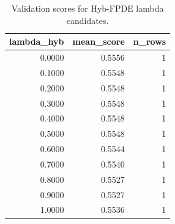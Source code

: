 \begin{table}[t]
\caption{Validation scores for Hyb-FPDE lambda candidates.}
\label{tab:lambda_distribution_computed}
\centering
\begin{tabular}{rrr}
\toprule
lambda\_hyb & mean\_score & n\_rows \\
\midrule
0.0000 & 0.5556 & 1 \\
0.1000 & 0.5548 & 1 \\
0.2000 & 0.5548 & 1 \\
0.3000 & 0.5548 & 1 \\
0.4000 & 0.5548 & 1 \\
0.5000 & 0.5548 & 1 \\
0.6000 & 0.5544 & 1 \\
0.7000 & 0.5540 & 1 \\
0.8000 & 0.5527 & 1 \\
0.9000 & 0.5527 & 1 \\
1.0000 & 0.5536 & 1 \\
\bottomrule
\end{tabular}

\end{table}
